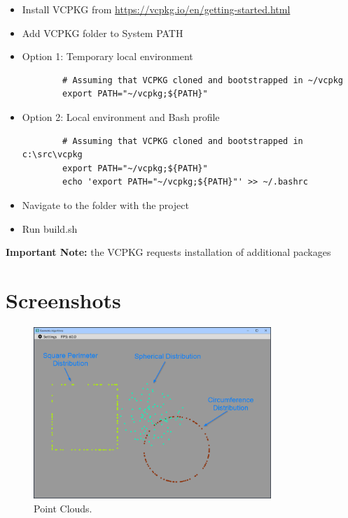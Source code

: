 \documentclass[12pt,a4paper,english]{article}
\begin{document}
\begin{itemize}
    \item Install VCPKG from \url{https://vcpkg.io/en/getting-started.html}
    \item Add VCPKG folder to System PATH
    \item Option 1: Temporary local environment
    \begin{verbatim}
        # Assuming that VCPKG cloned and bootstrapped in ~/vcpkg
        export PATH="~/vcpkg;${PATH}"
    \end{verbatim}

    \item Option 2: Local environment and Bash profile
    \begin{verbatim}
        # Assuming that VCPKG cloned and bootstrapped in c:\src\vcpkg
        export PATH="~/vcpkg;${PATH}"
        echo 'export PATH="~/vcpkg;${PATH}"' >> ~/.bashrc
    \end{verbatim}

    \item Navigate to the folder with the project
    \item Run build.sh
\end{itemize}
\textbf{Important Note:} the VCPKG requests installation of additional packages

\section{Screenshots}

\begin{figure}[H]
    \centering
    \includegraphics[width=0.8\textwidth]{point_cloud}
    \caption[]{Point Clouds.}
    \label{fig:point_cloud}
\end{figure}
\end{document}

